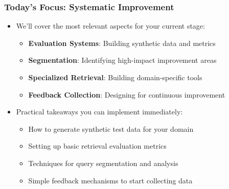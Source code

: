 {    \begin{frame}
        \frametitle{Today's Focus: Systematic Improvement}
        \begin{itemize}
            \item We'll cover the most relevant aspects for your current stage:
            \begin{itemize}
                \item \textbf{Evaluation Systems}: Building synthetic data and metrics
                \item \textbf{Segmentation}: Identifying high-impact improvement areas
                \item \textbf{Specialized Retrieval}: Building domain-specific tools
                \item \textbf{Feedback Collection}: Designing for continuous improvement
            \end{itemize}
            \item Practical takeaways you can implement immediately:
            \begin{itemize}
                \item How to generate synthetic test data for your domain
                \item Setting up basic retrieval evaluation metrics
                \item Techniques for query segmentation and analysis
                \item Simple feedback mechanisms to start collecting data
            \end{itemize}
        \end{itemize}
    \end{frame}

}
